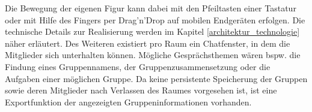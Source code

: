 Die Bewegung der eigenen Figur kann dabei mit den Pfeiltasten einer Tastatur oder mit Hilfe des Fingers per Drag'n'Drop auf mobilen Endgeräten erfolgen. Die technische Details zur Realisierung werden im Kapitel \ref{architektur_technologie} näher erläutert.
Des Weiteren existiert pro Raum ein Chatfenster, in dem die Mitglieder sich unterhalten können. Mögliche Gesprächsthemen wären bspw. die Findung eines Gruppennamens, der Gruppenzusammensetzung oder die Aufgaben einer möglichen Gruppe. Da keine persistente Speicherung der Gruppen sowie deren Mitglieder nach Verlassen des Raumes vorgesehen ist, ist eine Exportfunktion der angezeigten Gruppeninformationen vorhanden.

